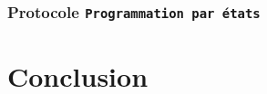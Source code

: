 \documentclass[a4paper,french,towsides,10pt]{book}
\begin{document}
\subsection{Protocole \texttt{Programmation par états}}



\chapter*{Conclusion}

\end{document}
